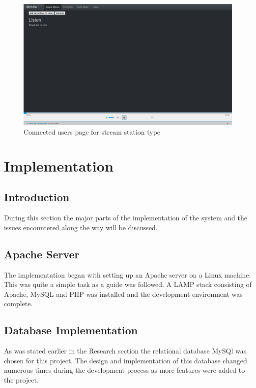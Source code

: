 \documentclass[a4paper, 12pt]{report}
\begin{document}
\begin{figure}[H]
  \centering
    \includegraphics[width=1.0\textwidth]{screenshots/station-type-5-listener.png}
    \caption{Connected users page for stream station type}
    \label{station-type-5-listener}
\end{figure}



\chapter{Implementation}

\section{Introduction}
During this section the major parts of the implementation of the system and the issues encountered along the way will be discussed.

\section{Apache Server}
The implementation began with setting up an Apache server on a Linux machine. This was quite a simple task as a guide\cite{set_up_apache} was followed. A LAMP stack consisting of Apache, MySQL and PHP was installed and the development environment was complete. 

\section{Database Implementation}
As was stated earlier in the Research section the relational database MySQl was chosen for this project. The design and implementation of this database changed numerous times during the development process as more features were added to the project. 
\end{document}
